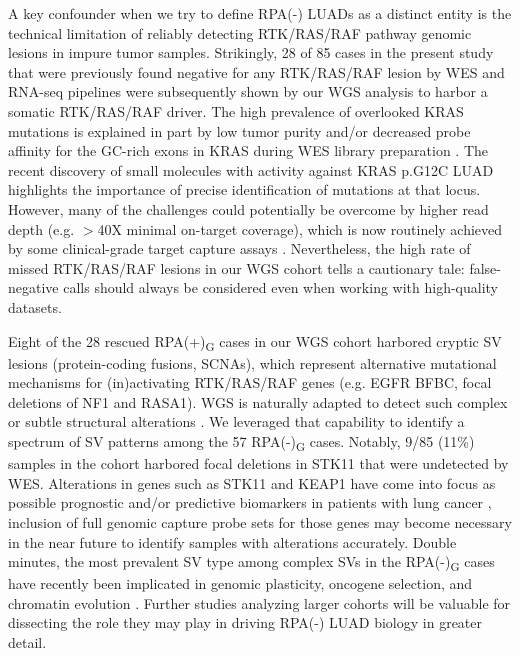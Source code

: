 \documentclass[phd,tocprelim]{cornell}
\begin{document}
A key confounder when we try to define RPA(-) LUADs as a distinct entity is the technical limitation of reliably detecting RTK/RAS/RAF pathway genomic lesions in impure tumor samples. Strikingly, 28 of 85 cases in the present study that were previously found negative for any RTK/RAS/RAF lesion by WES and RNA-seq pipelines were subsequently shown by our WGS analysis to harbor a somatic RTK/RAS/RAF driver. The high prevalence of overlooked KRAS mutations is explained in part by low tumor purity and/or decreased probe affinity for the GC-rich exons in KRAS during WES library preparation \cite{Clark2011-iq}. The recent discovery of small molecules with activity against KRAS p.G12C LUAD \cite{Canon2019-aj,Ostrem2013-lt} highlights the importance of precise identification of mutations at that locus. However, many of the challenges could potentially be overcome by higher read depth (e.g. $>$40X minimal on-target coverage), which is now routinely achieved by some clinical-grade target capture assays \cite{Goodman2017-wb,Zehir2017-ue}. Nevertheless, the high rate of missed RTK/RAS/RAF lesions in our WGS cohort tells a cautionary tale: false-negative calls should always be considered even when working with high-quality datasets.

Eight of the 28 rescued RPA(+)\textsubscript{G} cases in our WGS cohort harbored cryptic SV lesions (protein-coding fusions, SCNAs), which represent alternative mutational mechanisms for (in)activating RTK/RAS/RAF genes (e.g. EGFR BFBC, focal deletions of NF1 and RASA1). WGS is naturally adapted to detect such complex or subtle structural alterations \cite{Hadi2020-um}. We leveraged that capability to identify a spectrum of SV patterns among the 57 RPA(-)\textsubscript{G} cases. Notably, 9/85 (11\%) samples in the cohort harbored focal deletions in STK11 that were undetected by WES. Alterations in genes such as STK11 and KEAP1 have come into focus as possible prognostic and/or predictive biomarkers in patients with lung cancer \cite{Arbour2018-qg,Skoulidis2018-be}, inclusion of full genomic capture probe sets for those genes may become necessary in the near future to identify samples with alterations accurately. Double minutes, the most prevalent SV type among complex SVs in the RPA(-)\textsubscript{G} cases have recently been implicated in genomic plasticity, oncogene selection, and chromatin evolution \cite{Verhaak2019}. Further studies analyzing larger cohorts will be valuable for dissecting the role they may play in driving RPA(-) LUAD biology in greater detail.
\end{document}
